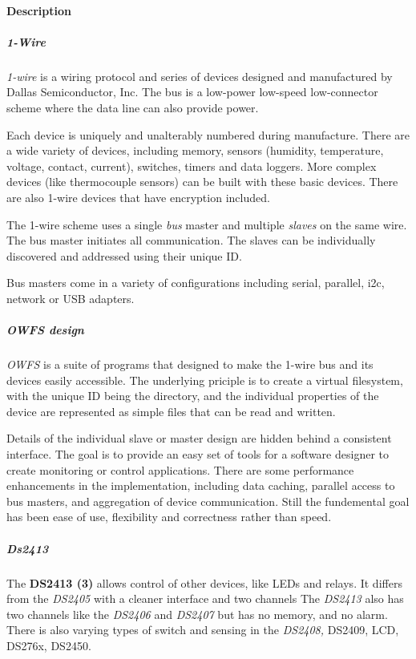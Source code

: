 \paragraph*{Description}
          
\subparagraph*{1-Wire}\textit{1-wire}  is a
wiring protocol and series of devices designed and manufactured by Dallas
Semiconductor, Inc. The bus is a low-power low-speed low-connector scheme where
the data line can also provide power. 

Each device is uniquely and unalterably
numbered during manufacture. There are a wide variety of devices, including
memory, sensors (humidity, temperature, voltage, contact, current), switches,
timers and data loggers. More complex devices (like thermocouple sensors)
can be built with these basic devices. There are also 1-wire devices that
have encryption included. 

The 1-wire scheme uses a single  \textit{bus} master and
multiple \textit{slaves} on the same wire. The bus master initiates all communication.
The slaves can be  individually discovered and addressed using their unique
ID. 

Bus masters come in a variety of configurations including serial, parallel,
i2c, network or USB adapters. 
\subparagraph*{OWFS design}\textit{OWFS} is a suite of programs that
designed to make the 1-wire bus and its devices easily accessible. The underlying
priciple is to create a virtual filesystem, with the unique ID being the
directory, and the individual properties of the device are represented
as simple files that can be read and written. 

Details of the individual
slave or master design are hidden behind a consistent interface. The goal
is to  provide an easy set of tools for a software designer to create monitoring
or control applications. There  are some performance enhancements in the
implementation, including data caching, parallel access to bus  masters,
and aggregation of device communication. Still the fundemental goal has
been ease of use, flexibility  and correctness rather than speed.  
\subparagraph*{Ds2413}The
\textsf{\textbf{DS2413 (3)}} allows control of other devices, like LEDs and relays. It differs
from the \textit{DS2405} with a cleaner interface and two channels The \textit{DS2413} also
has two channels like the \textit{DS2406} and \textit{DS2407} but has no memory, and no alarm.
There is also varying types of switch and sensing in the \textit{DS2408,} DS2409,
LCD, DS276x, DS2450. 

